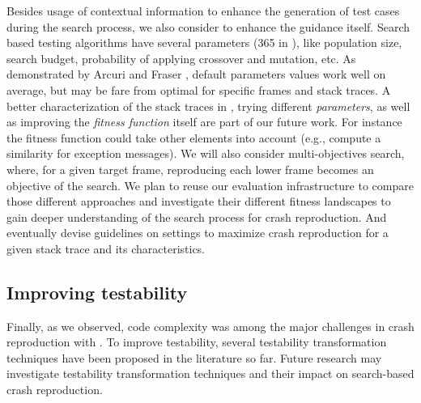 Besides usage of contextual information to enhance the generation of test cases during the search process, we also consider to enhance the guidance itself.
Search based testing algorithms have several parameters (365 in \evocrash), like population size, search budget, probability of applying crossover and mutation, etc. 
As demonstrated by Arcuri and Fraser \cite{Arcuri2011a}, default parameters values work well on average, but may be fare from optimal for specific frames and stack traces. 
A better characterization of the stack traces in \crashpack, trying different \emph{parameters}, as well as improving the \emph{fitness function} itself are part of our future work.
For instance the fitness function could take other elements into account (e.g., compute a similarity for exception messages).
We will also consider multi-objectives search, where, for a given target frame, reproducing each lower  frame becomes an objective of the search.
We plan to reuse our evaluation infrastructure to compare those different approaches and investigate their different fitness landscapes to gain deeper understanding of the search process for crash reproduction. And eventually devise guidelines on \evocrash settings to maximize crash reproduction for a given stack trace and its characteristics.

\subsection{Improving testability}

Finally, as we observed, code complexity was among the major challenges in crash reproduction with \evocrash.
To improve testability, several testability transformation techniques \cite{McMinn2011, LiBytecodeTT, MarkFlag,MarkFlagRemoval, MarkLoopFlag} have been proposed in the literature so far.
Future research may investigate testability transformation techniques and their impact on search-based crash reproduction.
